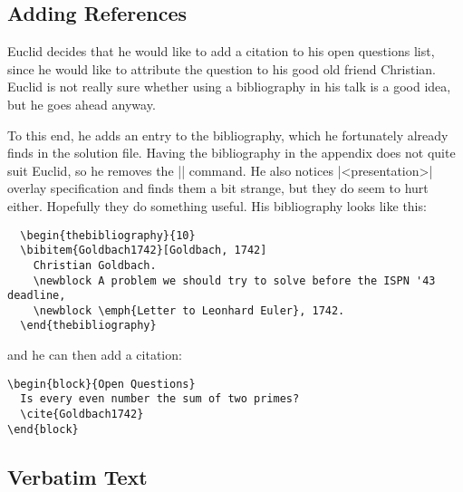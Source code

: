 \subsection{Adding References}

Euclid decides that he would like to add a citation to his open
questions list, since he would like to attribute the question to his
good old friend Christian. Euclid is not really sure whether using a
bibliography in his talk is a good idea, but he goes ahead anyway.

To this end, he adds an entry to the bibliography, which he
fortunately already finds in the solution file. Having the
bibliography in the appendix does not quite suit Euclid, so he removes
the |\appendix| command. He also notices |<presentation>| overlay
specification and finds them a bit strange, but they do seem to hurt
either. Hopefully they do something useful. His bibliography looks
like this:
\begin{verbatim}
  \begin{thebibliography}{10}
  \bibitem{Goldbach1742}[Goldbach, 1742]
    Christian Goldbach.
    \newblock A problem we should try to solve before the ISPN '43 deadline,
    \newblock \emph{Letter to Leonhard Euler}, 1742.
  \end{thebibliography}
\end{verbatim}
and he can then add a citation:
\begin{verbatim}
\begin{block}{Open Questions}
  Is every even number the sum of two primes?
  \cite{Goldbach1742}
\end{block}
\end{verbatim}





\subsection{Verbatim Text}

